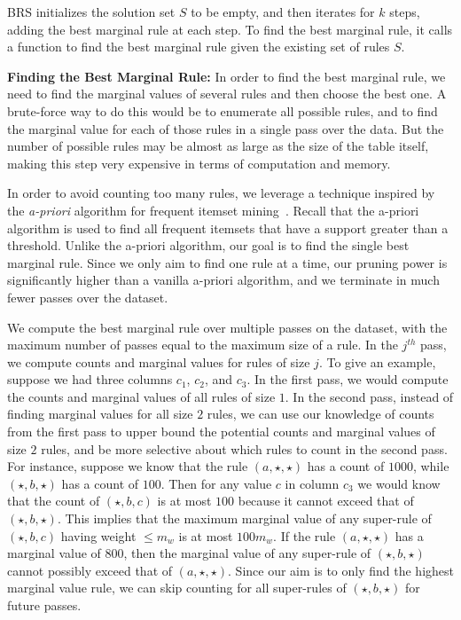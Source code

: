 \documentclass[10pt,journal,compsoc]{IEEEtran}
\newcommand{\stitle}[1]{\vspace{0.5em}\noindent\textbf{#1}}
\begin{document}
BRS initializes the solution set $S$ to be empty, and then iterates for $k$ steps, adding the best marginal rule at each step. To find the best marginal rule, it calls a function to find the best marginal rule given the existing set of rules $S$. 

\stitle{Finding the Best Marginal Rule:} In order to find the best marginal rule, we need to find the marginal values of several rules and then choose the best one. A brute-force way to do this would be to enumerate all possible rules, and to find the marginal value for each of those rules in a single pass over the data. But the number of possible rules may be almost as large as the size of the table itself, making this step very expensive in terms of computation and memory. 

In order to avoid counting too many rules, we leverage a technique inspired by the {\em a-priori} algorithm for frequent itemset mining~\cite{apriori}. Recall that the a-priori algorithm is used to find all frequent itemsets that have a support greater than a threshold. Unlike the a-priori algorithm, our goal is to find the single best marginal rule. Since we only aim to find one rule at a time, our pruning power is significantly higher than a vanilla a-priori algorithm, and we terminate in much fewer passes over the dataset. 

We compute the best marginal rule over multiple passes on the dataset, with the maximum number of passes equal to the maximum size of a rule. In the $j^{th}$ pass, we compute counts and marginal values for rules of size $j$. To give an example, suppose we had three columns $c_1$, $c_2$, and $c_3$. In the first pass, we would compute the counts and marginal values of all rules of size $1$. In the second pass, instead of finding marginal values for all size $2$ rules, we can use our knowledge of counts from the first pass to upper bound the potential counts and marginal values of size $2$ rules, and be more selective about which rules to count in the second pass. For instance, suppose we know that the rule $(a, \star, \star)$ has a count of $1000$, while $(\star, b, \star)$ has a count of $100$. Then for any value $c$ in column $c_3$ we would know that the count of $(\star, b, c)$ is at most $100$ because it cannot exceed that of $(\star, b, \star)$. This implies that the maximum marginal value of any super-rule of $(\star, b, c)$ having weight $\leq m_w$ is at most $100m_w$. If the rule $(a, \star, \star)$ has a marginal value of $800$, then the marginal value of any super-rule of $(\star, b, \star)$ cannot possibly exceed that of $(a, \star, \star)$. Since our aim is to only find the highest marginal value rule, we can skip counting for all super-rules of $(\star, b, \star)$ for future passes.
\end{document}
